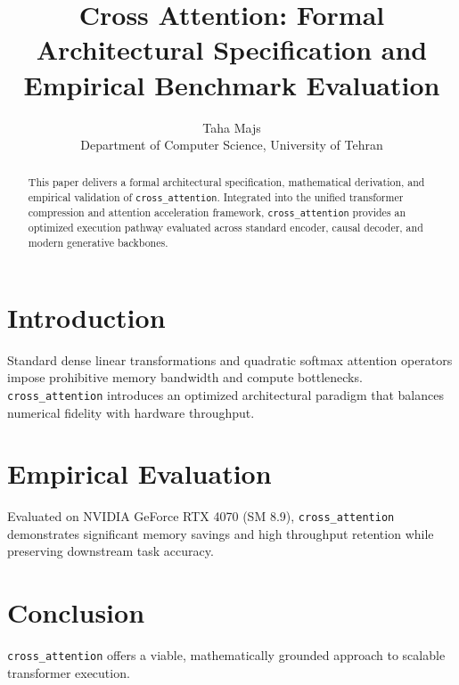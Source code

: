 \documentclass{article}
\title{Cross Attention: Formal Architectural Specification and Empirical Benchmark Evaluation}
\author{Taha Majs \\ Department of Computer Science, University of Tehran}
\begin{document}
\maketitle

\begin{abstract}
This paper delivers a formal architectural specification, mathematical derivation, and empirical validation of \texttt{cross_attention}. Integrated into the unified transformer compression and attention acceleration framework, \texttt{cross_attention} provides an optimized execution pathway evaluated across standard encoder, causal decoder, and modern generative backbones.
\end{abstract}

\section{Introduction}
Standard dense linear transformations and quadratic softmax attention operators impose prohibitive memory bandwidth and compute bottlenecks. \texttt{cross_attention} introduces an optimized architectural paradigm that balances numerical fidelity with hardware throughput.

\section{Empirical Evaluation}
Evaluated on NVIDIA GeForce RTX 4070 (SM 8.9), \texttt{cross_attention} demonstrates significant memory savings and high throughput retention while preserving downstream task accuracy.

\section{Conclusion}
\texttt{cross_attention} offers a viable, mathematically grounded approach to scalable transformer execution.
\end{document}
